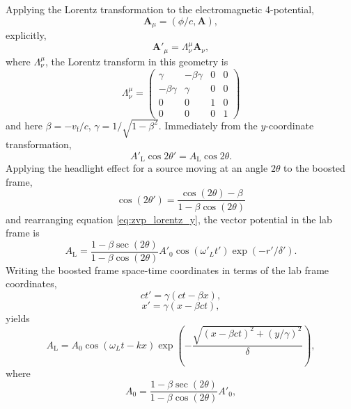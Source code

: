 Applying the Lorentz transformation to the electromagnetic 4-potential,
\begin{equation}
	\mathbf{A}_\mu = (\phi/c,\mathbf{A}),
\end{equation}
explicitly,
\begin{equation}
	\mathbf{A}'_\mu = \Lambda^\mu_\nu \mathbf{A}_\nu,
\end{equation}
where $\Lambda^\mu_\nu$, the Lorentz transform in this geometry is
\begin{equation}\label{eq:zvp_lorentz}
	\Lambda^\mu_\nu = \begin{pmatrix}
			\gamma & -\beta\gamma & 0 & 0\\
			-\beta\gamma & \gamma & 0 & 0\\
			0 & 0& 1 & 0\\
			0 & 0 & 0 & 1
	\end{pmatrix}
\end{equation}
and here $\beta = -v_\mathrm{f}/c$, $\gamma = 1/\sqrt{1-\beta^2}$. Immediately from the $y$-coordinate transformation,
\begin{equation}\label{eq:zvp_lorentz_y}
	A'_\mathrm{L}\cos{2\theta'} = A_\mathrm{L}\cos{2\theta}.
\end{equation}
Applying the headlight effect for a source moving at an angle $2\theta$ to the boosted frame,
\begin{equation}
	\cos{(2\theta')} = \frac{\cos{(2\theta)}-\beta}{1 - \beta\cos{(2\theta)}}
\end{equation}
and rearranging equation \ref{eq:zvp_lorentz_y}, the vector potential in the lab frame is
\begin{equation}\label{eq:zvp_labA}
	A_\mathrm{L} = \frac{1-\beta \sec{(2\theta)}}{1 - \beta\cos{(2\theta)}} A'_0\cos{(\omega'_L t')}\exp{(-r'/\delta')}.
\end{equation}
Writing the boosted frame space-time coordinates in terms of the lab frame coordinates,
\begin{equation}
	ct' = \gamma(ct-\beta x),
\end{equation}
\begin{equation}
	x' = \gamma(x-\beta ct),
\end{equation}
yields
\begin{equation}\label{eq:zvp_labAfull}
	A_\mathrm{L} =  A_0\cos{(\omega_L t - kx)}\exp{\left(-\frac{\sqrt{(x-\beta ct)^2+(y/\gamma)^2}}{\delta}\right)},
\end{equation}
where
\begin{equation}
	A_0 = \frac{1-\beta \sec{(2\theta)}}{1 - \beta\cos{(2\theta)}}A'_0,
\end{equation}
